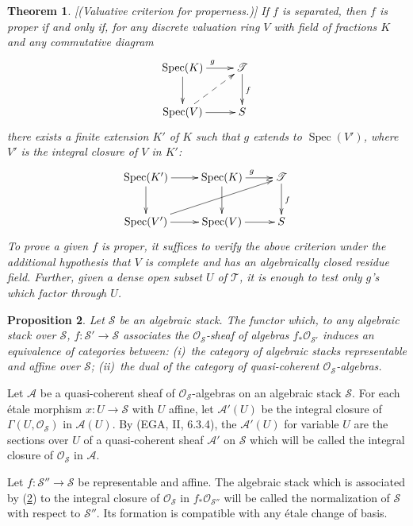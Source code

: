 \documentclass[10pt]{amsart}
\theoremstyle{plain}
\newtheorem{theorem}{Theorem}[section]
\newtheorem{proposition}[theorem]{Proposition}
\theoremstyle{definition}
\DeclareMathOperator{\Spec}{Spec}
\newcommand{\cO}{\mathcal{O}}
\begin{document}
\begin{theorem}\label{thm:4.19}[(Valuative criterion for properness.)]
If $f$ is separated, then $f$ is proper if and only if, for any discrete valuation ring $V$ with field of fractions $K$ and any commutative diagram
\[
\xymatrix{
\Spec(K) \ar[r]^g \ar[d] & \mathscr{T} \ar[d]^f \\
\Spec(V) \ar[r] \ar@{-->}[ur] & S
}
\]
there exists a finite extension $K'$ of $K$ such that $g$ extends to $\Spec(V')$, where $V'$ is the integral closure of $V$ in $K'$:
\[
\xymatrix{
\Spec(K') \ar[r] \ar[d] & \Spec(K) \ar[r]^g \ar[d] & \mathscr{T} \ar[d]^f \\
\Spec(V') \ar[r] \ar[urr] & \Spec(V) \ar[r] & S
}
\]
To prove a given $f$ is proper, it suffices to verify the above criterion under the additional hypothesis that $V$ is complete and has an algebraically closed residue field. Further, given a dense open subset $U$ of $\mathscr{T}$, it is enough to test only $g$'s which factor through $U$.
\end{theorem}

\begin{proposition}\label{prop:4.20}
Let $\mathscr{S}$ be an algebraic stack. The functor which, to any algebraic stack over $\mathscr{S}$, $f: \mathscr{S}' \to \mathscr{S}$ associates the $\cO_{\mathscr{S}}$-sheaf of algebras $f_* \cO_{\mathscr{S}'}$ induces an equivalence of categories between: (i)~the category of algebraic stacks representable and affine over $\mathscr{S}$; (ii)~the dual of the category of quasi-coherent $\cO_{\mathscr{S}}$-algebras.
\end{proposition}

Let $\mathscr{A}$ be a quasi-coherent sheaf of $\cO_{\mathscr{S}}$-algebras on an algebraic stack $\mathscr{S}$. For each \'etale morphism $x: U \to \mathscr{S}$ with $U$ affine, let $\mathscr{A}'(U)$ be the integral closure of $\Gamma(U, \cO_{\mathscr{S}})$ in $\mathscr{A}(U)$. By (EGA, II, 6.3.4), the $\mathscr{A}'(U)$ for variable $U$ are the sections over $U$ of a quasi-coherent sheaf $\mathscr{A}'$ on $\mathscr{S}$ which will be called the integral closure of $\cO_{\mathscr{S}}$ in $\mathscr{A}$.

Let $f: \mathscr{S}'' \to \mathscr{S}$ be representable and affine. The algebraic stack which is associated by (\ref{prop:4.20}) to the integral closure of $\cO_{\mathscr{S}}$ in $f_* \cO_{\mathscr{S}''}$ will be called the normalization of $\mathscr{S}$ with respect to $\mathscr{S}''$. Its formation is compatible with any \'etale change of basis.
\end{document}
